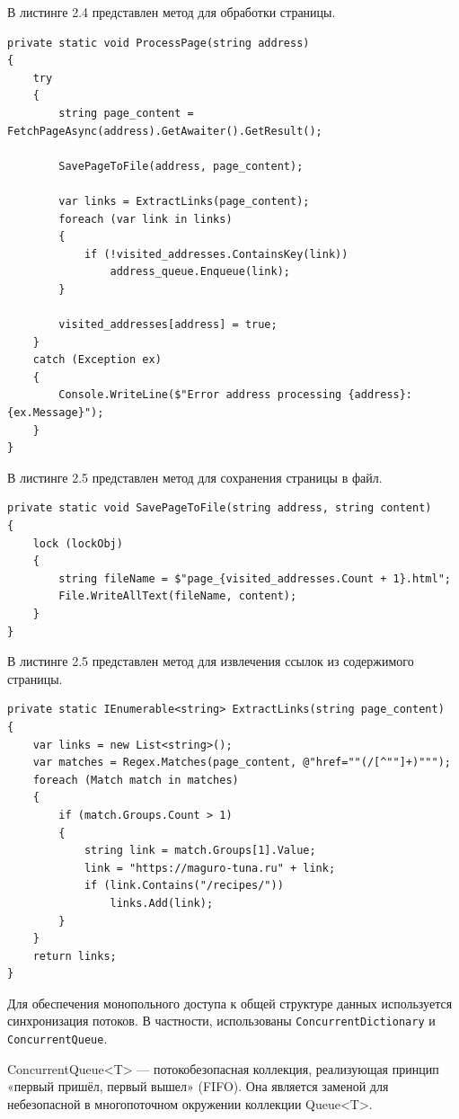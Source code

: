 В листинге 2.4 представлен метод для обработки страницы.

\begin{lstlisting}[caption={Метод ProcessPage для обработки страницы}]
private static void ProcessPage(string address)
{
    try
    {
        string page_content = FetchPageAsync(address).GetAwaiter().GetResult();

        SavePageToFile(address, page_content);

        var links = ExtractLinks(page_content);
        foreach (var link in links)
        {
            if (!visited_addresses.ContainsKey(link))
                address_queue.Enqueue(link);
        }

        visited_addresses[address] = true;
    }
    catch (Exception ex)
    {
        Console.WriteLine($"Error address processing {address}: {ex.Message}");
    }
}
\end{lstlisting}

В листинге 2.5 представлен метод для сохранения страницы в файл.

\begin{lstlisting}[caption={Метод SavePageToFile для сохранения страницы в файл}]
private static void SavePageToFile(string address, string content)
{
    lock (lockObj)
    {
        string fileName = $"page_{visited_addresses.Count + 1}.html";
        File.WriteAllText(fileName, content);
    }
}
\end{lstlisting}

В листинге 2.5 представлен метод для извлечения ссылок из содержимого страницы.

\begin{lstlisting}[caption={Метод ExtractLinks для извлечения ссылок из содержимого страницы}]
private static IEnumerable<string> ExtractLinks(string page_content)
{
    var links = new List<string>();
    var matches = Regex.Matches(page_content, @"href=""(/[^""]+)""");
    foreach (Match match in matches)
    {
        if (match.Groups.Count > 1)
        {
            string link = match.Groups[1].Value;
            link = "https://maguro-tuna.ru" + link;
            if (link.Contains("/recipes/"))
                links.Add(link);
        }
    }
    return links;
}
\end{lstlisting}

Для обеспечения монопольного доступа к общей структуре данных используется синхронизация потоков. В частности, использованы \texttt{ConcurrentDictionary} и \texttt{ConcurrentQueue}.


ConcurrentQueue<T> — потокобезопасная коллекция, реализующая принцип «первый пришёл, первый вышел» (FIFO). Она является заменой для небезопасной в многопоточном окружении коллекции Queue<T>.~\cite{lit2}


